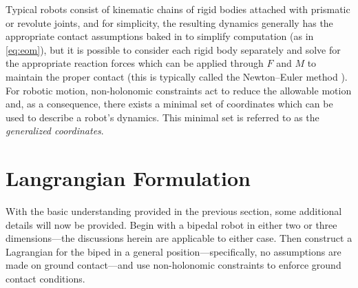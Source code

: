 
Typical robots consist of kinematic chains of rigid bodies attached with
prismatic or revolute joints, and for simplicity, the resulting dynamics
generally has the appropriate contact assumptions baked in to simplify
computation (as in \eqref{eq:eom}), but it is possible to consider
each rigid body separately and solve for the appropriate reaction forces which
can be applied through $F$ and $M$ to maintain the proper contact (this is
typically called the Newton--Euler method \cite{Hollerbach1980}).
%
For robotic motion, non-holonomic constraints act to reduce the allowable motion
and, as a consequence, there exists a minimal set of coordinates which can be
used to describe a robot's dynamics.
%
This minimal set is referred to as the {\em generalized coordinates}.


\section{Langrangian Formulation}

%
%

With the basic understanding provided in the previous section, some additional
details will now be provided.
%
Begin with a bipedal robot in either two or three dimensions---the discussions
herein are applicable to either case.
%
Then construct a Lagrangian for the biped in a general position---specifically,
no assumptions are made on ground contact---and use non-holonomic constraints to
enforce ground contact conditions.


